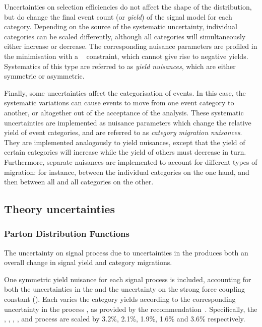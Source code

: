 Uncertainties on selection efficiencies do not affect the shape of the \mgg distribution, but do change the final event count (or \emph{yield}) of the signal model for each category. Depending on the source of the systematic uncertainty, individual categories can be scaled differently, although all categories will simultaneously either increase or decrease. The corresponding nuisance parameters are profiled in the \NLL minimisation with a \lnN~\cite{1987lognormal} constraint, which cannot give rise to negative yields. Systematics of this type are referred to as \emph{yield nuisances}, which are either symmetric or asymmetric. %

Finally, some uncertainties affect the categorisation of events. In this case, the systematic variations can cause events to move from one event category to another, or altogether out of the acceptance of the analysis. These systematic uncertainties are implemented as nuisance parameters which change the relative yield of event categories, and are referred to as \emph{category migration nuisances}. They are implemented analogously to yield nuisances, except that the yield of certain categories will increase while the yield of others must decrease in turn. Furthermore, separate nuisances are implemented to account for different types of migration: for instance, between the individual \VBFTag categories on the one hand, and then between all \VBFTag and all \Untagged categories on the other.


\subsection{Theory uncertainties}
\subsubsection{Parton Distribution Functions}

The uncertainty on signal process \crosssection\s due to uncertainties in the \PDF produces both an overall change in signal yield and category migrations.

One symmetric yield nuisance for each signal process is included, accounting for both the uncertainties in the \PDF\s and the uncertainty on the strong force coupling constant (\alphaS). Each varies the category yields according to the corresponding uncertainty in the process \crosssection, as provided by the \LHCHXSWG recommendation~\cite{LHCHXSWGYR4}. Specifically, the \ggH, \VBF, \WH, \ZH, and \ttH process \crosssection\s are scaled by 3.2\%, 2.1\%, 1.9\%, 1.6\% and 3.6\% respectively. 

